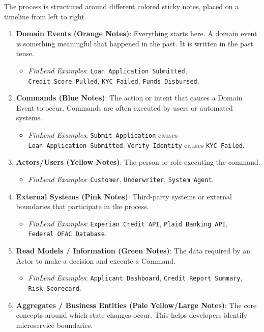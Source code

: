 The process is structured around different colored sticky notes, placed
on a timeline from left to right.

\begin{enumerate}
\def\labelenumi{\arabic{enumi}.}
\tightlist
\item
  \textbf{Domain Events (Orange Notes)}: Everything starts here. A
  domain event is something meaningful that happened in the past. It is
  written in the past tense.

  \begin{itemize}
  \tightlist
  \item
    \emph{FinLend Examples}: \texttt{Loan\ Application\ Submitted},
    \texttt{Credit\ Score\ Pulled}, \texttt{KYC\ Failed},
    \texttt{Funds\ Disbursed}.
  \end{itemize}
\item
  \textbf{Commands (Blue Notes)}: The action or intent that causes a
  Domain Event to occur. Commands are often executed by users or
  automated systems.

  \begin{itemize}
  \tightlist
  \item
    \emph{FinLend Examples}: \texttt{Submit\ Application} causes
    \texttt{Loan\ Application\ Submitted}. \texttt{Verify\ Identity}
    causes \texttt{KYC\ Failed}.
  \end{itemize}
\item
  \textbf{Actors/Users (Yellow Notes)}: The person or role executing the
  command.

  \begin{itemize}
  \tightlist
  \item
    \emph{FinLend Examples}: \texttt{Customer}, \texttt{Underwriter},
    \texttt{System\ Agent}.
  \end{itemize}
\item
  \textbf{External Systems (Pink Notes)}: Third-party systems or
  external boundaries that participate in the process.

  \begin{itemize}
  \tightlist
  \item
    \emph{FinLend Examples}: \texttt{Experian\ Credit\ API},
    \texttt{Plaid\ Banking\ API}, \texttt{Federal\ OFAC\ Database}.
  \end{itemize}
\item
  \textbf{Read Models / Information (Green Notes)}: The data required by
  an Actor to make a decision and execute a Command.

  \begin{itemize}
  \tightlist
  \item
    \emph{FinLend Examples}: \texttt{Applicant\ Dashboard},
    \texttt{Credit\ Report\ Summary}, \texttt{Risk\ Scorecard}.
  \end{itemize}
\item
  \textbf{Aggregates / Business Entities (Pale Yellow/Large Notes)}: The
  core concepts around which state changes occur. This helps developers
  identify microservice boundaries.


\end{enumerate}
